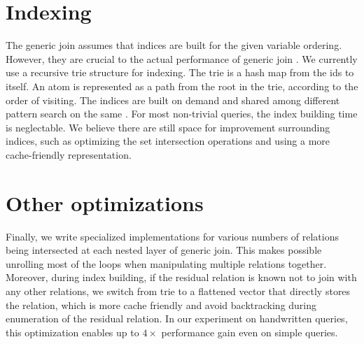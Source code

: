 \section{Indexing}

The generic join assumes that indices are built for the given variable ordering. However, they are crucial to the actual performance of generic join \citep{eval-wcoj}.
We currently use a recursive trie structure for indexing. The trie is a hash map from the \eclass ids to itself. An atom is represented as a path from the root in the trie, according to the order of visiting. The indices are built on demand and shared among different \ematching pattern search on the same \egraph. For most non-trivial \ematching queries, the index building time is neglectable.
We believe there are still space for improvement surrounding indices, such as optimizing the set intersection operations and using a more cache-friendly representation.

\section{Other optimizations}

Finally, we write specialized implementations for various numbers of relations being intersected at each nested layer of generic join. This makes possible unrolling most of the loops when manipulating multiple relations together. Moreover, during index building, if the residual relation is known not to join with any other relations, we switch from trie to a flattened vector that directly stores the relation, which is more cache friendly and avoid backtracking during enumeration of the residual relation. In our experiment on handwritten queries, this optimization enables up to $4\times$ performance gain even on simple queries.